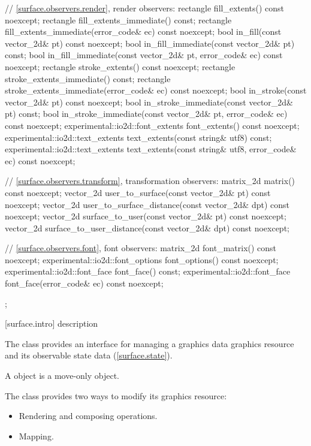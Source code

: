 \begin{codeblock}
{{{{{    // \ref{surface.observers.render}, render observers:
    rectangle fill_extents() const noexcept;
    rectangle fill_extents_immediate() const;
    rectangle fill_extents_immediate(error_code& ec) const noexcept;
    bool in_fill(const vector_2d& pt) const noexcept;
    bool in_fill_immediate(const vector_2d& pt) const;
    bool in_fill_immediate(const vector_2d& pt, error_code& ec) const noexcept;
    rectangle stroke_extents() const noexcept;
    rectangle stroke_extents_immediate() const;
    rectangle stroke_extents_immediate(error_code& ec) const noexcept;
    bool in_stroke(const vector_2d& pt) const noexcept;
    bool in_stroke_immediate(const vector_2d& pt) const;
    bool in_stroke_immediate(const vector_2d& pt, error_code& ec) const 
      noexcept;
    experimental::io2d::font_extents font_extents() const noexcept;
    experimental::io2d::text_extents text_extents(const string& utf8) const;
    experimental::io2d::text_extents text_extents(const string& utf8,
      error_code& ec) const noexcept;
    
    // \ref{surface.observers.transform}, transformation observers:
    matrix_2d matrix() const noexcept;
    vector_2d user_to_surface(const vector_2d& pt) const noexcept;
    vector_2d user_to_surface_distance(const vector_2d& dpt) const noexcept;
    vector_2d surface_to_user(const vector_2d& pt) const noexcept;
    vector_2d surface_to_user_distance(const vector_2d& dpt) const noexcept;
    
    // \ref{surface.observers.font}, font observers:
    matrix_2d font_matrix() const noexcept;
    experimental::io2d::font_options font_options() const noexcept;
    experimental::io2d::font_face font_face() const;
    experimental::io2d::font_face font_face(error_code& ec) const noexcept;
  };
} } } }
\end{codeblock}

 [surface.intro] { description}

\pnum
{}
The  class provides an interface for managing a graphics
data graphics resource and its observable state data
(\ref{surface.state}).

\pnum
A  object is a move-only object.

\pnum
The  class provides two ways to modify its graphics resource:
\begin{itemize}
\item Rendering and composing operations.
\item Mapping.
\end{itemize}

